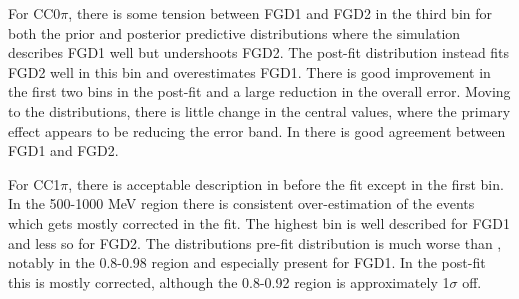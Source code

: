 For CC0$\pi$, there is some tension between FGD1 and FGD2 in the third \pmu bin for both the prior and posterior predictive distributions where the simulation describes FGD1 well but undershoots FGD2. The post-fit distribution instead fits FGD2 well in this bin and overestimates FGD1. There is good improvement in the first two \pmu bins in the post-fit and a large reduction in the overall error. Moving to the \cosmu distributions, there is little change in the central values, where the primary effect appears to be reducing the error band. In \cosmu there is good agreement between FGD1 and FGD2.

For CC1$\pi$, there is acceptable description in \pmu before the fit except in the first bin. In the 500-1000 MeV region there is consistent over-estimation of the events which gets mostly corrected in the fit. The highest bin is well described for FGD1 and less so for FGD2. The \cosmu distributions pre-fit distribution is much worse than \pmu, notably in the 0.8-0.98 region and especially present for FGD1. In the post-fit this is mostly corrected, although the 0.8-0.92 region is approximately 1$\sigma$ off.

